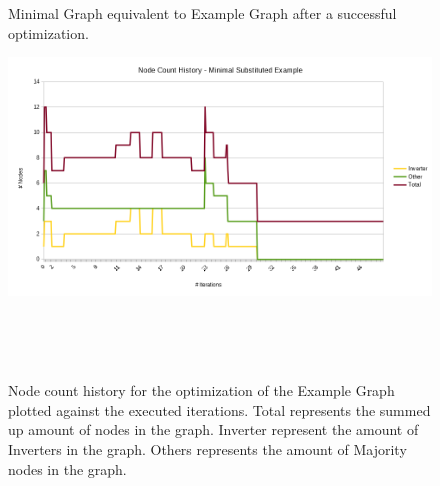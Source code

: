 \documentclass[
	accentcolor=1c,%
	type=intern,
	marginpar=false,
	ruledheaders=section,
	class=report,
	BCOR=5mm,
      parskip=half-,
	fontsize=10pt
	]{tudapub}
\begin{document}
\begin{figure}[!ht]
\begin{minipage}{\textwidth}
\begin{minipage}{.45\textwidth}
						\caption{Minimal Graph equivalent to Example Graph after a successful optimization.}
						\label{fig_2}
					\end{minipage} \quad
					\begin{minipage}{.45\textwidth}
						\includegraphics[width=\textwidth]{images/eval_3.png}
						\caption{Node count history for the optimization of the Example Graph plotted against the executed iterations. Total represents the summed up amount of nodes in the graph. Inverter represent the amount of Inverters in the graph. Others represents the amount of Majority nodes in the graph.}
						\label{fig_3}
					\end{minipage}\\
				\end{minipage}\\[1em]
			\end{figure}
\end{document}
